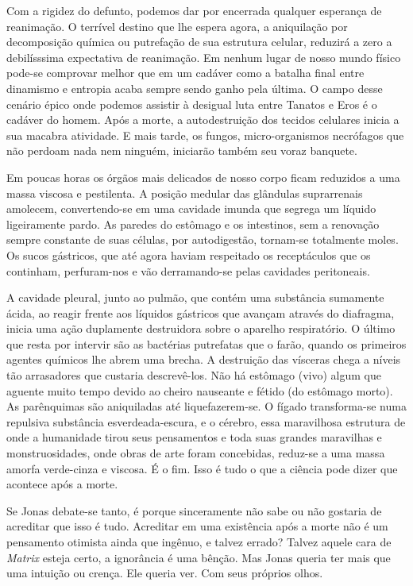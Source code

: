 Com a rigidez do defunto, podemos dar por encerrada qualquer esperança de reanimação. O terrível destino que lhe espera agora, a aniquilação por decomposição química ou putrefação de sua estrutura celular, reduzirá a zero a debilísssima expectativa de reanimação. Em nenhum lugar de nosso mundo físico pode-se comprovar melhor que em um cadáver como a batalha final entre dinamismo e entropia acaba sempre sendo ganho pela última. O campo desse cenário épico onde podemos assistir à desigual luta entre Tanatos e Eros é o cadáver do homem. Após a morte, a autodestruição dos tecidos celulares inicia a sua macabra atividade. E mais tarde, os fungos, micro-organismos necrófagos que não perdoam nada nem ninguém, iniciarão também seu voraz banquete.

Em poucas horas\mudanca{,} os órgãos mais delicados de nosso corpo ficam reduzidos a uma massa viscosa e pestilenta. A posição medular das glândulas suprarrenais amolecem, convertendo-se em uma cavidade imunda que segrega um líquido ligeiramente pardo. As paredes do estômago e os intestinos, sem a renovação sempre constante de suas células, por autodigestão, tornam-se totalmente moles. Os sucos gástricos, que até agora haviam respeitado os receptáculos que os continham, perfuram-nos e vão derramando-se pelas cavidades peritoneais.

A cavidade pleural, junto ao pulmão, que contém uma substância sumamente ácida, ao reagir frente aos líquidos gástricos que avançam através do diafragma, inicia uma ação duplamente destruidora sobre o aparelho respiratório. O último que resta por intervir são as bactérias putrefatas que o farão, quando os primeiros agentes químicos lhe abrem uma brecha. A destruição das vísceras chega a níveis tão arrasadores que custaria descrevê-los. Não há estômago (vivo) algum que aguente muito tempo devido ao cheiro nauseante e fétido (do estômago morto). As parênquimas são aniquiladas até liquefazerem-se. O fígado transforma-se numa repulsiva substância esverdeada-escura, e o cérebro, essa maravilhosa estrutura de onde a humanidade tirou seus pensamentos e toda suas grandes maravilhas e monstruosidades, onde obras de arte foram concebidas, reduz-se a uma massa amorfa verde-cinza e viscosa. É o fim. Isso é tudo o que a ciência pode dizer que acontece após a morte.

Se Jonas debate-se tanto, é porque sinceramente não sabe ou não gostaria de acreditar que isso é tudo. Acreditar em uma existência após a morte não é um pensamento otimista ainda que ingênuo, e talvez errado? Talvez aquele cara de \emph{Matrix} esteja certo, a ignorância é uma bênção. Mas Jonas queria ter mais que uma intuição ou crença. Ele queria ver. Com seus próprios olhos.


